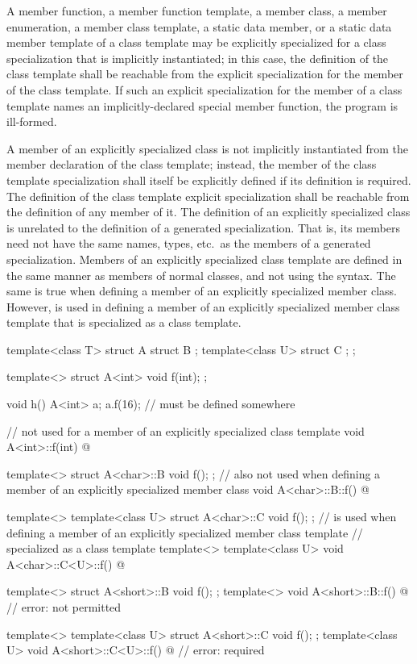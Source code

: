 \pnum
A member function, a member function template, a member class,
a member enumeration, a
member class template,
a static data member, or a static data member template of a class template
may be explicitly specialized for a class specialization that is implicitly
instantiated;
in this case, the definition of the class template shall
be reachable from the explicit specialization for the member of the class
template.
If such an explicit specialization for the member of a class template names an
implicitly-declared special member function,
the program is ill-formed.

\pnum
A member of an explicitly specialized class is not implicitly
instantiated from the member declaration of the class template;
instead, the member of the class template specialization shall itself be
explicitly defined if its definition is required.
The definition of the class template explicit specialization
shall be reachable from the definition of any member of it.
The definition of an explicitly specialized class is unrelated to the
definition of a generated specialization.
That is, its members need
not have the same names, types, etc.\ as the members of a generated
specialization.
Members of an explicitly specialized
class template are defined in the same manner as members of normal classes, and
not using the  syntax.
The same is true when defining a member of an explicitly specialized member
class. However,  is used in defining a member of an explicitly
specialized member class template that is specialized as a class template.
\begin{example}
\begin{codeblock}
template<class T> struct A {
  struct B { };
  template<class U> struct C { };
};

template<> struct A<int> {
  void f(int);
};

void h() {
  A<int> a;
  a.f(16);          //  must be defined somewhere
}

//  not used for a member of an explicitly specialized class template
void A<int>::f(int) { @\commentellip@ }

template<> struct A<char>::B {
  void f();
};
//  also not used when defining a member of an explicitly specialized member class
void A<char>::B::f() { @\commentellip@ }

template<> template<class U> struct A<char>::C {
  void f();
};
//  is used when defining a member of an explicitly specialized member class template
// specialized as a class template
template<>
template<class U> void A<char>::C<U>::f() { @\commentellip@ }

template<> struct A<short>::B {
  void f();
};
template<> void A<short>::B::f() { @\commentellip@ }              // error:  not permitted

template<> template<class U> struct A<short>::C {
  void f();
};
template<class U> void A<short>::C<U>::f() { @\commentellip@ }    // error:  required
\end{codeblock}
\end{example}

